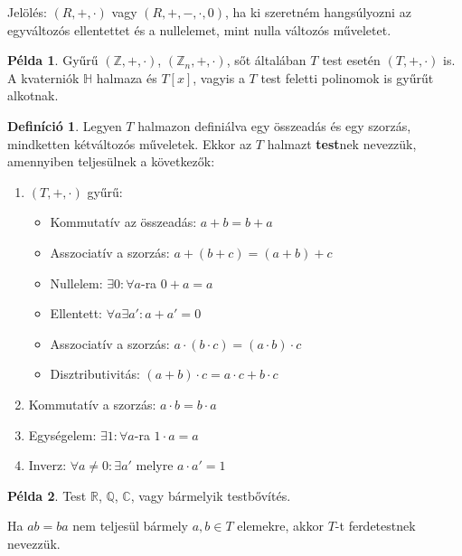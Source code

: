\documentclass[12pt]{book}
\theoremstyle{plain} %
\theoremstyle{definition} %
\newtheorem{defi/}{Definíció}[section]
\newenvironment{defi}
  {\renewcommand{\qedsymbol}{$\clubsuit$}%
   \pushQED{\qed}\begin{defi/}}
  {\popQED\end{defi/}}
\newtheorem{pl}{Példa}[section]
\theoremstyle{remark}
\renewcommand\qedsymbol{$\blacksquare$}
\numberwithin{equation}{section}  %
\def\Q{\mathbb{Q}}
\def\R{\mathbb{R}}
\def\Z{\mathbb{Z}}
\def\C{\mathbb{C}}
\begin{document}
	Jelölés: $(R,+,\cdot)$ vagy $(R,+,-,\cdot,0)$, ha ki szeretném hangsúlyozni az egyváltozós ellentettet és a nullelemet, mint nulla változós műveletet.
	
	\begin{pl}
		Gyűrű $(\Z,+,\cdot)$, $(\Z_n,+,\cdot)$, sőt általában $T$ test esetén $(T,+,\cdot)$ is. A kvaterniók $\mathbb{H}$ halmaza és $T[x]$, vagyis a $T$ test feletti polinomok is gyűrűt alkotnak.
	\end{pl}

	\begin{defi}
		Legyen $T$ halmazon definiálva egy összeadás és egy szorzás, mindketten kétváltozós műveletek. Ekkor az $T$ halmazt \textbf{test}nek nevezzük, amennyiben teljesülnek a következők:
		\begin{enumerate}
			\item{$(T,+,\cdot)$ gyűrű:
			\begin{itemize}
				\item{Kommutatív az összeadás: $a + b = b + a$}
				\item{Asszociatív a szorzás: $a + (b + c) = (a + b) + c$}
				\item{Nullelem: $\exists 0: \forall a$-ra $0 + a = a$}
				\item{Ellentett: $\forall a \exists a': a+a' = 0$ }
				\item{Asszociatív a szorzás: $a\cdot (b\cdot c) = (a\cdot b)\cdot c$}
				\item{Disztributivitás: $(a+b)\cdot c = a\cdot c + b\cdot c$}
			\end{itemize}
		}			
			\item{Kommutatív a szorzás: $a\cdot b = b \cdot a$}
			\item{Egységelem: $\exists 1: \forall a$-ra $1\cdot a = a$}
			\item{Inverz: $\forall a\neq 0: \exists a'$ melyre $ a \cdot a' = 1$ }
		\end{enumerate}
	\end{defi}

	\begin{pl}
		Test $\R$, $\Q$, $\C$, vagy bármelyik testbővítés.
	\end{pl}

	Ha $ab=ba$ nem teljesül bármely $a,b\in T$ elemekre, akkor $T$-t ferdetestnek nevezzük.
\end{document}
